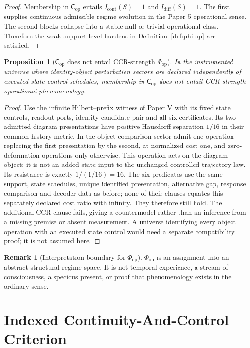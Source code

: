 \documentclass[11pt,a4paper]{article}
\newtheorem{proposition}[theorem]{Proposition}
\theoremstyle{definition}
\newtheorem{remark}[theorem]{Remark}
\newcommand{\Cop}{\mathsf{C}_{\mathrm{op}}}
\newcommand{\Phiop}{\Phi_{\mathrm{op}}}
\newcommand{\Icont}{I_{\mathrm{cont}}}
\newcommand{\Idiff}{I_{\mathrm{diff}}}
\begin{document}
\begin{proof}
Membership in $\Cop$ entails $\Icont(S)=1$ and $\Idiff(S)=1$. The first supplies continuous admissible regime evolution in the Paper 5 operational sense. The second blocks collapse into a stable null or trivial operational class. Therefore the weak support-level burdens in Definition~\ref{def:phi-op} are satisfied.
\end{proof}

\begin{proposition}[$\Cop$ does not entail CCR-strength $\Phiop$]\label{prop:cop-not-ccr}
In the instrumented universe where identity-object perturbation sectors are
declared independently of executed state-control schedules, membership in
$\Cop$ does not entail CCR-strength operational phenomenology.
\end{proposition}
\begin{proof}
Use the infinite Hilbert--prefix witness of Paper V with its fixed state
controls, readout ports, identity-candidate pair and all six certificates.
Its two admitted diagram presentations have positive Hausdorff separation
$1/16$ in their common history metric. In the object-comparison sector admit
one operation replacing the first presentation by the second, at normalized
cost one, and zero-deformation operations only otherwise. This operation
acts on the diagram object; it is not an added state input to the unchanged
controlled trajectory law. Its resistance is exactly $1/(1/16)=16$.
The six predicates use the same support, state schedules, unique identified
presentation, alternative gap, response comparison and decoder data as before;
none of their clauses equates this separately declared cost ratio with
infinity. They therefore still hold. The additional CCR clause fails, giving
a countermodel rather than an inference from a missing premise or absent
measurement. A universe identifying every object operation with an executed
state control would need a separate compatibility proof; it is not assumed here.
\end{proof}

\begin{remark}[Interpretation boundary for $\Phiop$]
$\Phiop$ is an assignment into an abstract structural regime space. It is not temporal experience, a stream of consciousness, a specious present, or proof that phenomenology exists in the ordinary sense.
\end{remark}

\section{Indexed Continuity-And-Control Criterion}
\end{document}

